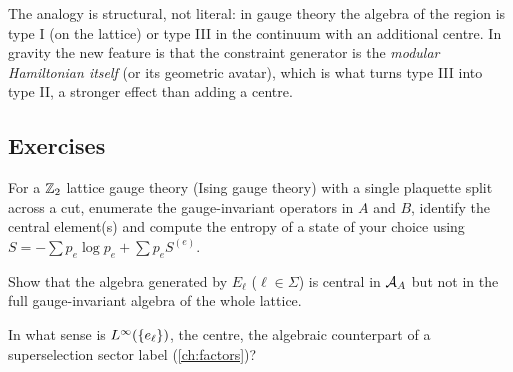 \begin{center}
\renewcommand{\arraystretch}{1.3}
\end{center}

\begin{whatwrong}
The analogy is structural, not literal: in gauge theory the algebra of the region is type I (on the lattice) or type III in the continuum with an additional centre. In gravity the new feature is that the constraint generator is the \emph{modular Hamiltonian itself} (or its geometric avatar), which is what turns type III into type II, a stronger effect than adding a centre.
\end{whatwrong}

\subsection*{Exercises}
\begin{exercise}\label{ex:gauge_warmup:1}
For a $\mathbb{Z}_2$ lattice gauge theory (Ising gauge theory) with a single plaquette split across a cut, enumerate the gauge-invariant operators in $A$ and $B$, identify the central element(s) and compute the entropy of a state of your choice using $S=-\sum p_e\log p_e+\sum p_eS^{(e)}$.
\end{exercise}
\begin{exercise}\label{ex:gauge_warmup:2}
Show that the algebra generated by $E_\ell$ ($\ell\in\Sigma$) is central in $\mathcal{A}_A$ but not in the full gauge-invariant algebra of the whole lattice.
\end{exercise}
\begin{exercise}\label{ex:gauge_warmup:3}
In what sense is $L^\infty(\{e_\ell\})$, the centre, the algebraic counterpart of a superselection sector label (\cref{ch:factors})?
\end{exercise}

